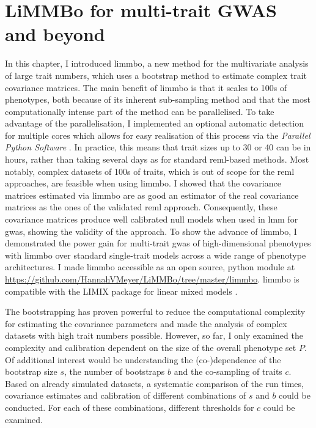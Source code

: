 \section{LiMMBo for multi-trait GWAS and beyond}
\label{section:conclusion-limmbo}
In this chapter, I introduced \gls{limmbo}, a new method for the multivariate analysis of large trait numbers, which uses a bootstrap method to estimate complex trait covariance matrices. The main benefit of \gls{limmbo} is that it scales to \num{100}s of phenotypes, both because of its inherent sub-sampling method and that the most computationally intense part of the method can be parallelised. To take advantage of the parallelisation, I implemented an optional automatic detection for multiple cores which allows for easy realisation of this process via the \textit{Parallel Python Software} \citep{PPSoftware}. In practice, this means that trait sizes up to 30 or 40 can be in hours, rather than taking several days as for standard \gls{reml}-based methods. Most notably, complex datasets of \num{100}s of traits, which is out of scope for the \gls{reml} approaches, are feasible when using \gls{limmbo}. I showed that the covariance matrices estimated via \gls{limmbo} are as good an estimator of the real covariance matrices as the ones of the validated \gls{reml} approach. Consequently, these covariance matrices produce well calibrated null models when used in \gls{lmm} for \gls{gwas}, showing the validity of the approach. To show the advance of \gls{limmbo}, I demonstrated the power gain for multi-trait \gls{gwas} of high-dimensional phenotypes with \gls{limmbo} over standard single-trait models across a wide range of phenotype architectures. I made \gls{limmbo} accessible as an open source, python module at \url{https://github.com/HannahVMeyer/LiMMBo/tree/master/limmbo}. \gls{limmbo} is compatible with the LIMIX package for linear mixed models \citep{Lippert2014}.  

The bootstrapping has proven powerful to reduce the computational complexity for estimating the covariance parameters and made the analysis of complex datasets with high trait numbers possible. However, so far, I only examined the complexity and calibration dependent on the size of the overall phenotype set \(P\). Of additional interest would be understanding the (co-)dependence of the bootstrap size \(s\),  the number of bootstraps \(b\) and the  co-sampling of traits \(c\). Based on already simulated datasets, a systematic comparison of the run times, covariance estimates and calibration of different combinations of \(s\) and \(b\) could be conducted. For each of these combinations, different thresholds for \(c\) could be examined.

